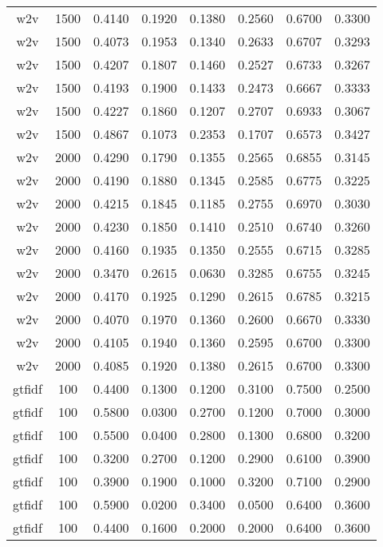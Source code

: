 \begin{scriptsize}
\begin{longtable}{cccccccc}
		w2v      & 1500 & 0.4140 & 0.1920 & 0.1380 & 0.2560 & 0.6700 & 0.3300 \\
		w2v      & 1500 & 0.4073 & 0.1953 & 0.1340 & 0.2633 & 0.6707 & 0.3293 \\
		w2v      & 1500 & 0.4207 & 0.1807 & 0.1460 & 0.2527 & 0.6733 & 0.3267 \\
		w2v      & 1500 & 0.4193 & 0.1900 & 0.1433 & 0.2473 & 0.6667 & 0.3333 \\
		w2v      & 1500 & 0.4227 & 0.1860 & 0.1207 & 0.2707 & 0.6933 & 0.3067 \\
		w2v      & 1500 & 0.4867 & 0.1073 & 0.2353 & 0.1707 & 0.6573 & 0.3427 \\
		w2v      & 2000 & 0.4290 & 0.1790 & 0.1355 & 0.2565 & 0.6855 & 0.3145 \\
		w2v      & 2000 & 0.4190 & 0.1880 & 0.1345 & 0.2585 & 0.6775 & 0.3225 \\
		w2v      & 2000 & 0.4215 & 0.1845 & 0.1185 & 0.2755 & 0.6970 & 0.3030 \\
		w2v      & 2000 & 0.4230 & 0.1850 & 0.1410 & 0.2510 & 0.6740 & 0.3260 \\
		w2v      & 2000 & 0.4160 & 0.1935 & 0.1350 & 0.2555 & 0.6715 & 0.3285 \\
		w2v      & 2000 & 0.3470 & 0.2615 & 0.0630 & 0.3285 & 0.6755 & 0.3245 \\
		w2v      & 2000 & 0.4170 & 0.1925 & 0.1290 & 0.2615 & 0.6785 & 0.3215 \\
		w2v      & 2000 & 0.4070 & 0.1970 & 0.1360 & 0.2600 & 0.6670 & 0.3330 \\
		w2v      & 2000 & 0.4105 & 0.1940 & 0.1360 & 0.2595 & 0.6700 & 0.3300 \\
		w2v      & 2000 & 0.4085 & 0.1920 & 0.1380 & 0.2615 & 0.6700 & 0.3300 \\
		gtfidf   & 100  & 0.4400 & 0.1300 & 0.1200 & 0.3100 & 0.7500 & 0.2500 \\
		gtfidf   & 100  & 0.5800 & 0.0300 & 0.2700 & 0.1200 & 0.7000 & 0.3000 \\
		gtfidf   & 100  & 0.5500 & 0.0400 & 0.2800 & 0.1300 & 0.6800 & 0.3200 \\
		gtfidf   & 100  & 0.3200 & 0.2700 & 0.1200 & 0.2900 & 0.6100 & 0.3900 \\
		gtfidf   & 100  & 0.3900 & 0.1900 & 0.1000 & 0.3200 & 0.7100 & 0.2900 \\
		gtfidf   & 100  & 0.5900 & 0.0200 & 0.3400 & 0.0500 & 0.6400 & 0.3600 \\
		gtfidf   & 100  & 0.4400 & 0.1600 & 0.2000 & 0.2000 & 0.6400 & 0.3600 \\

\end{longtable}
\end{scriptsize}
